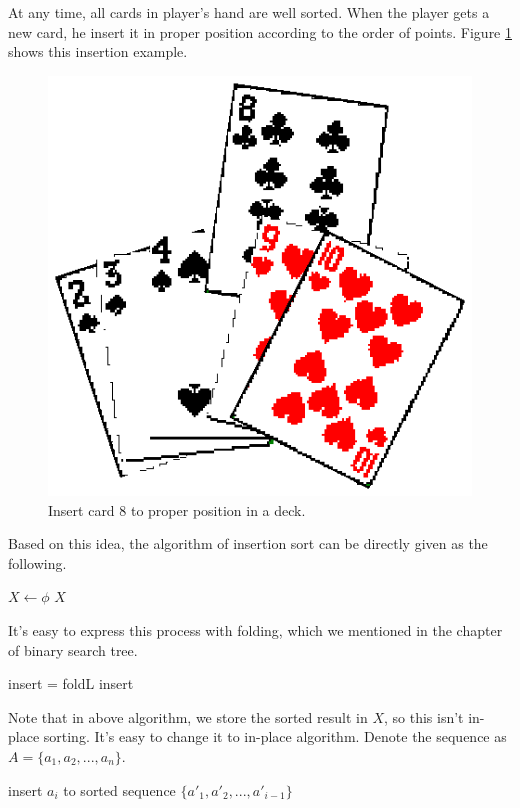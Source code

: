 \documentclass{article}
\begin{document}
At any time, all cards in player's hand are well sorted. When the player
gets a new card, he insert it in proper position according to the order
of points. Figure \ref{fig:hand-of-cards} shows this insertion example.

\begin{figure}[htbp]
  \centering
  \includegraphics[scale=0.5]{img/hand-of-cards.eps}
  \caption{Insert card 8 to proper position in a deck.}
  \label{fig:hand-of-cards}
\end{figure}

Based on this idea, the algorithm of insertion sort can be directly
given as the following.

\begin{algorithmic}
  \State $X \gets \phi$
    \State {}
  \EndFor
  \State \Return $X$
\EndFunction
\end{algorithmic}

It's easy to express this process with folding, which we
mentioned in the chapter of binary search tree.

\be
  insert = foldL \quad insert \quad \phi
\ee

Note that in above algorithm, we store the sorted result in $X$,
so this isn't in-place sorting. It's easy to change it to in-place
algorithm. Denote the sequence as $A = \{a_1, a_2, ..., a_n\}$.

\begin{algorithmic}
    \State insert $a_i$ to sorted sequence $\{a'_1, a'_2, ..., a'_{i-1} \}$
  \EndFor
\EndFunction
\end{algorithmic}
\end{document}
